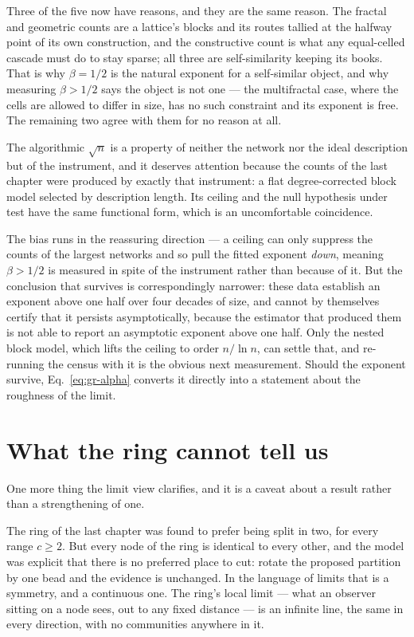 Three of the five now have reasons, and they are the same reason. The fractal and
geometric counts are a lattice's blocks and its routes tallied at the halfway point
of its own construction, and the constructive count is what any equal-celled cascade
must do to stay sparse; all three are self-similarity keeping its books. That is why
$\beta=1/2$ is the natural exponent for a self-similar object, and why measuring
$\beta>1/2$ says the object is not one --- the multifractal case, where the cells
are allowed to differ in size, has no such constraint and its exponent is free.
The remaining two agree with them for no reason at all.

The algorithmic $\sqrt{n}$ is a property of neither the network nor the ideal
description but of the instrument, and it deserves attention because the counts of
the last chapter were produced by exactly that instrument: a flat degree-corrected
block model selected by description length. Its ceiling and the null hypothesis under test
have the same functional form, which is an uncomfortable coincidence.

The bias runs in the reassuring direction --- a ceiling can only suppress the
counts of the largest networks and so pull the fitted exponent \emph{down},
meaning $\beta>1/2$ is measured in spite of the instrument rather than because of
it. But the conclusion that survives is correspondingly narrower: these data
establish an exponent above one half over four decades of size, and cannot by
themselves certify that it persists asymptotically, because the estimator that
produced them is not able to report an asymptotic exponent above one half. Only
the nested block model, which lifts the ceiling to order $n/\ln n$, can settle
that, and re-running the census with it is the obvious next measurement. Should
the exponent survive, Eq.~\eqref{eq:gr-alpha} converts it directly into a
statement about the roughness of the limit.

\section{What the ring cannot tell us}

One more thing the limit view clarifies, and it is a caveat about a result rather
than a strengthening of one.

The ring of the last chapter was found to prefer being split in two, for every
range $c\ge2$. But every node of the ring is identical to every other, and the
model was explicit that there is no preferred place to cut: rotate the proposed
partition by one bead and the evidence is unchanged. In the language of limits
that is a symmetry, and a continuous one. The ring's local limit --- what an
observer sitting on a node sees, out to any fixed distance
\citep{benjamini2001} --- is an infinite line, the same in every direction, with
no communities anywhere in it.

